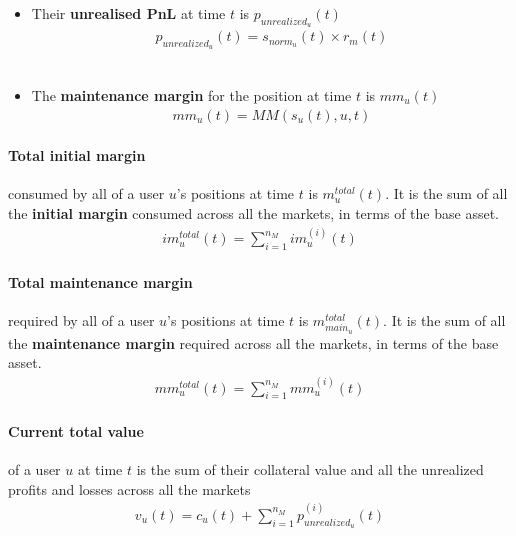\documentclass{article}%
\begin{document}
\begin{itemize}
\begin{itemize}
  
            \item Their \textbf{unrealised PnL} at time $t$ is $p_{unrealized_u}(t)$ \\
                \begin{align*}
                    p_{unrealized_u}(t) = s_{{norm_u}}(t) \times r_m(t)
                \end{align*}\
             
            \item The \textbf{maintenance margin} for the position at time $t$ is $mm_u(t)$
                \begin{align*}
                    mm_u(t) = MM \left( s_u(t), u, t \right)
                \end{align*}  
            
        \end{itemize}
\end{itemize}

\paragraph{Total initial margin} consumed by all of a user $u$'s positions at time $t$ is $m^{total}_u(t)$. It is the sum of all the \textbf{initial margin} consumed across all the markets, in terms of the base asset.
    \begin{align*}
        im^{total}_u(t) = \sum_{i=1}^{n_M} im_u^{(i)}(t)
    \end{align*}

\paragraph{Total maintenance margin} required by all of a user $u$'s positions at time $t$ is $m^{total}_{{main}_u}(t)$. It is the sum of all the \textbf{maintenance margin} required across all the markets, in terms of the base asset.
    \begin{align*}
        mm^{total}_{u}(t) = \sum_{i=1}^{n_M} mm_u^{(i)}(t)
    \end{align*}

\paragraph{Current total value} of a user $u$ at time $t$ is the sum of their collateral value and all the unrealized profits and losses across all the markets
    \begin{align*}
        v_u(t) = c_u(t) + \sum_{i=1}^{n_M} p_{unrealized_u}^{(i)}(t)
    \end{align*}
\end{document}
